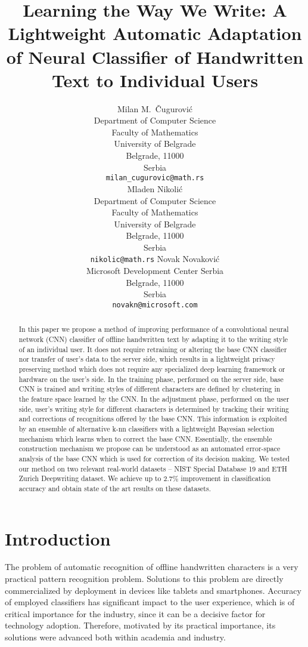 \documentclass{article}
\title{Learning the Way We Write: A Lightweight Automatic Adaptation of %
Neural Classifier of Handwritten Text to Individual Users}
\author{%
  Milan M.~Čugurović\\
  Department of Computer Science\\
  Faculty of Mathematics\\
  University of Belgrade\\
  Belgrade, 11000\\
  Serbia\\
  \texttt{milan\_cugurovic@math.rs} \\
  \And
  Mladen Nikolić\\
  Department of Computer Science\\
  Faculty of Mathematics\\
  University of Belgrade\\
  Belgrade, 11000\\
  Serbia\\
  \texttt{nikolic@math.rs}
  \And
  Novak Novaković \\
  Microsoft Development Center Serbia\\
  Belgrade, 11000\\
  Serbia\\
  \texttt{novakn@microsoft.com}
}
\begin{document}
\maketitle

\begin{abstract}
  In this paper we propose a method of improving performance of a convolutional neural network (CNN) classifier of offline handwritten text by adapting it to the writing 
  style of an individual user. It does not require retraining or altering the base CNN classifier nor transfer of user's data to the server side, which results in 
  a lightweight privacy preserving method which does not require any specialized deep learning framework or hardware on the user's side. In the training phase, 
  performed on the server side, base CNN is trained and writing styles of different characters are defined by clustering in the feature space learned by the CNN. 
  In the adjustment phase, performed on the user side, user's writing style for different characters is determined by tracking their writing and corrections of 
  recognitions offered by the base CNN. This information is exploited by an ensemble of alternative k-nn classifiers with a lightweight Bayesian selection mechanism 
  which learns when to correct the base CNN. Essentially, the ensemble construction mechanism we propose can be understood as an automated error-space analysis of 
  the base CNN which is used for correction of its decision making.
  We tested our method on two relevant real-world datasets -- NIST Special Database 19 and ETH Zurich Deepwriting dataset. 
  We achieve up to 2.7\% improvement in classification accuracy and obtain state of the art results on these datasets.
\end{abstract}

\section{Introduction}
The problem of automatic recognition of offline handwritten characters is a very practical pattern recognition problem. Solutions to this problem are directly commercialized  by deployment in devices like tablets and smartphones. 
Accuracy of employed classifiers has significant impact to the user experience, which is of critical importance for the industry, since it can be a decisive factor for technology adoption. 
Therefore, motivated by its practical importance, its solutions were advanced both within academia and industry. 
\end{document}
